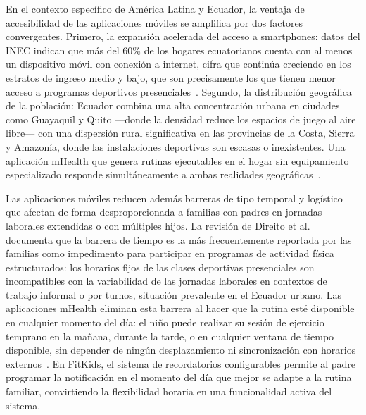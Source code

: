 					En el contexto específico de América Latina y Ecuador, la ventaja de accesibilidad de las aplicaciones móviles se amplifica por dos factores convergentes. Primero, la expansión acelerada del acceso a smartphones: datos del INEC indican que más del 60\% de los hogares ecuatorianos cuenta con al menos un dispositivo móvil con conexión a internet, cifra que continúa creciendo en los estratos de ingreso medio y bajo, que son precisamente los que tienen menor acceso a programas deportivos presenciales~\cite{UN2015}. Segundo, la distribución geográfica de la población: Ecuador combina una alta concentración urbana en ciudades como Guayaquil y Quito ---donde la densidad reduce los espacios de juego al aire libre--- con una dispersión rural significativa en las provincias de la Costa, Sierra y Amazonía, donde las instalaciones deportivas son escasas o inexistentes. Una aplicación mHealth que genera rutinas ejecutables en el hogar sin equipamiento especializado responde simultáneamente a ambas realidades geográficas~\cite{Direito2017,VegaDiaz2023}.
					
					Las aplicaciones móviles reducen además barreras de tipo temporal y logístico que afectan de forma desproporcionada a familias con padres en jornadas laborales extendidas o con múltiples hijos. La revisión de Direito et al.~\cite{Direito2017} documenta que la barrera de tiempo es la más frecuentemente reportada por las familias como impedimento para participar en programas de actividad física estructurados: los horarios fijos de las clases deportivas presenciales son incompatibles con la variabilidad de las jornadas laborales en contextos de trabajo informal o por turnos, situación prevalente en el Ecuador urbano. Las aplicaciones mHealth eliminan esta barrera al hacer que la rutina esté disponible en cualquier momento del día: el niño puede realizar su sesión de ejercicio temprano en la mañana, durante la tarde, o en cualquier ventana de tiempo disponible, sin depender de ningún desplazamiento ni sincronización con horarios externos~\cite{Direito2017,Baumann2022}. En FitKids, el sistema de recordatorios configurables permite al padre programar la notificación en el momento del día que mejor se adapte a la rutina familiar, convirtiendo la flexibilidad horaria en una funcionalidad activa del sistema.
					
